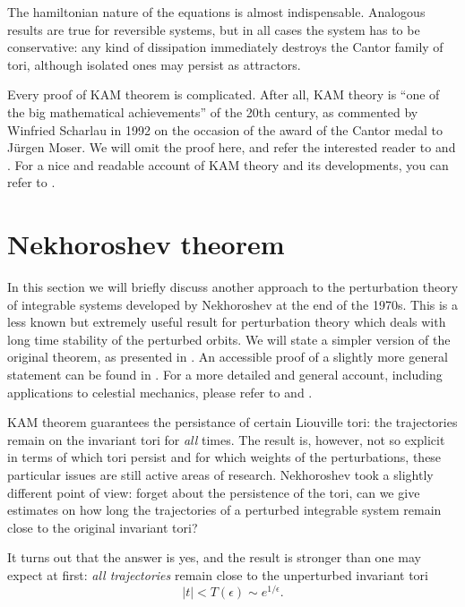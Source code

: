 \documentclass[english,fontsize=11pt,paper=a5,oneside]{scrbook}
\theoremstyle{definition}
\newenvironment{remark}
  {\pushQED{\qed}\renewcommand{\qedsymbol}{$\lozenge$}\remarkx}
  {\popQED\endremarkx}
\begin{document}
\begin{remark}
  The hamiltonian nature of the equations is almost indispensable. Analogous results are true for reversible systems, but in all cases the system has to be conservative:
  any kind of dissipation immediately destroys the Cantor family of tori, although isolated ones may persist as attractors.
\end{remark}

Every proof of KAM theorem is complicated.
After all, KAM theory is ``one of the big mathematical achievements'' of the 20th century, as commented by Winfried Scharlau in 1992 on the occasion of the award of the Cantor medal to J\"urgen Moser.
We will omit the proof here, and refer the interested reader to \cite[Chapter 15]{book:knauf} and \cite{poschel2001}.
For a nice and readable account of KAM theory and its developments, you can refer to \cite{Broer2004}.

\section{Nekhoroshev theorem}

In this section we will briefly discuss another approach to the perturbation theory of integrable systems developed by Nekhoroshev at the end of the 1970s.
This is a less known but extremely useful result for perturbation theory which deals with long time stability of the perturbed orbits.
We will state a simpler version of the original theorem, as presented in \cite{Benettin1985}.
An accessible proof of a slightly more general statement can be found in \cite{Poschel1993}.
For a more detailed and general account, including applications to celestial mechanics, please refer to \cite[Chapter 8]{book:celletti} and \cite[Chapter 6]{book:arnoldcelestial}.

KAM theorem guarantees the persistance of certain Liouville tori: the trajectories remain on the invariant tori for \emph{all} times. The result is, however, not so explicit in terms of which tori persist and for which weights of the perturbations, these particular issues are still active areas of research.
Nekhoroshev took a slightly different point of view: forget about the persistence of the tori, can we give estimates on how long the trajectories of a perturbed integrable system remain close to the original invariant tori?

It turns out that the answer is yes, and the result is stronger than one may expect at first: \emph{all trajectories} remain close to the unperturbed invariant tori 
\begin{equation}
  |t| < T(\epsilon) \sim e^{1/\epsilon}.
\end{equation}
\end{document}

